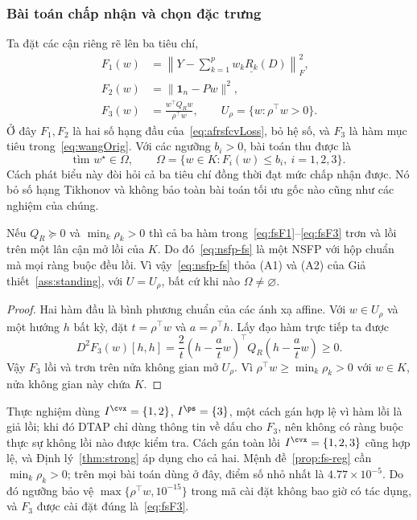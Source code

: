 \subsubsection{Bài toán chấp nhận và chọn đặc trưng}\label{ssec:reduction}\label{ssec:selection}
Ta đặt các cận riêng rẽ lên ba tiêu chí,
\begin{align}
F_1(w)&=\left\|Y-\sum_{k=1}^{p}w_k\underline{R_k}(D)\right\|_F^2,\label{eq:fsF1}\\
F_2(w)&=\|\mathbf1_n-Pw\|^2,\label{eq:fsF2}\\
F_3(w)&=\frac{w^{\top}Q_Rw}{\rho^{\top}w},\qquad U_\rho=\{w:\rho^{\top}w>0\}.\label{eq:fsF3}
\end{align}
Ở đây $F_1,F_2$ là hai số hạng đầu của~\eqref{eq:afrsfcvLoss}, bỏ hệ số, và $F_3$ là hàm mục tiêu trong~\eqref{eq:wangOrig}. Với các ngưỡng $b_i>0$, bài toán thu được là
\begin{equation}\label{eq:nsfp-fs}
\text{tìm }w^\star\in\Omega,\qquad \Omega=\{w\in K:F_i(w)\le b_i,\ i=1,2,3\}.
\end{equation}
Cách phát biểu này đòi hỏi cả ba tiêu chí đồng thời đạt mức chấp nhận được. Nó bỏ số hạng Tikhonov và không bảo toàn bài toán tối ưu gốc nào cũng như các nghiệm của chúng.

\begin{proposition}\label{prop:fs-reg}
Nếu $Q_R\succeq0$ và $\min_k\rho_k>0$ thì cả ba hàm trong~\eqref{eq:fsF1}--\eqref{eq:fsF3} trơn và lồi trên một lân cận mở lồi của $K$. Do đó~\eqref{eq:nsfp-fs} là một NSFP với hộp chuẩn mà mọi ràng buộc đều lồi. Vì vậy~\eqref{eq:nsfp-fs} thỏa (A1) và (A2) của Giả thiết~\ref{ass:standing}, với $U=U_\rho$, bất cứ khi nào $\Omega\ne\varnothing$.
\end{proposition}
\begin{proof}
Hai hàm đầu là bình phương chuẩn của các ánh xạ affine. Với $w\in U_\rho$ và một hướng $h$ bất kỳ, đặt $t=\rho^{\top}w$ và $a=\rho^{\top}h$. Lấy đạo hàm trực tiếp ta được
\begin{equation}\label{eq:fsF3-curvature}
D^2F_3(w)[h,h]=\frac2t\left(h-\frac atw\right)^{\!\top}Q_R\left(h-\frac atw\right)\ge0.
\end{equation}
Vậy $F_3$ lồi và trơn trên nửa không gian mở $U_\rho$. Vì $\rho^{\top}w\ge\min_k\rho_k>0$ với $w\in K$, nửa không gian này chứa $K$.
\end{proof}

Thực nghiệm dùng $I^{\cvx}=\{1,2\}$, $I^{\ps}=\{3\}$, một cách gán hợp lệ vì hàm lồi là giả lồi; khi đó DTAP chỉ dùng thông tin về dấu cho $F_3$, nên không có ràng buộc thực sự không lồi nào được kiểm tra. Cách gán toàn lồi $I^{\cvx}=\{1,2,3\}$ cũng hợp lệ, và Định lý~\ref{thm:strong} áp dụng cho cả hai. Mệnh đề~\ref{prop:fs-reg} cần $\min_k\rho_k>0$; trên mọi bài toán dùng ở đây, điểm số nhỏ nhất là $4.77\times10^{-5}$. Do đó ngưỡng bảo vệ $\max\{\rho^\top w,10^{-15}\}$ trong mã cài đặt không bao giờ có tác dụng, và $F_3$ được cài đặt đúng là~\eqref{eq:fsF3}.

